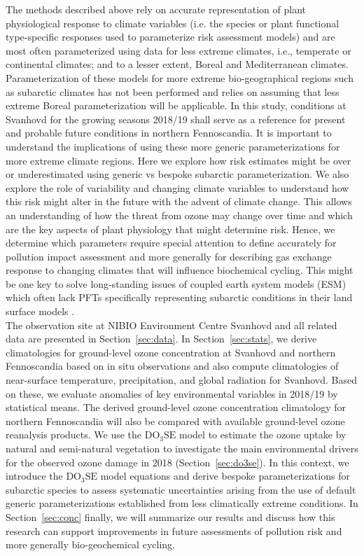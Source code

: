 \documentclass[bg, manuscript]{copernicus}
\begin{document}
The methods described above rely on accurate representation of plant physiological response to climate variables (i.e. the species or plant functional type-specific responses used to parameterize risk assessment models) and are most often parameterized using data for less extreme climates, i.e., temperate or continental climates; and to a lesser extent, Boreal and Mediterranean climates. Parameterization of these models for more extreme bio-geographical regions such as subarctic climates has not been performed and relies on assuming that less extreme Boreal parameterization will be applicable. In this study, conditions at Svanhovd for the growing seasons 2018/19 shall serve as a reference for present and probable future conditions in northern Fennoscandia.
It is important to understand the implications of using these more generic parameterizations for more extreme climate regions. Here we explore how risk estimates might be over or underestimated using generic vs bespoke subarctic parameterization. We also explore the role of \chem{[O_3]} variability and changing climate variables to understand how this risk might alter in the future with the advent of climate change. This allows an understanding of how the threat from ozone may change over time and which are the key aspects of plant physiology that might determine risk. Hence, we determine which parameters require special attention to define accurately for pollution impact assessment and more generally for describing gas exchange response to changing climates that will influence biochemical cycling. This might be one key to solve long-standing issues of coupled earth system models (ESM) which often lack PFTs specifically representing subarctic conditions in their land surface models \citep{GMD:Poulter2015,JAMES:Lawrence2019}.\\

The observation site at NIBIO Environment Centre Svanhovd and all related data are presented in Section~\ref{sec:data}. In Section~\ref{sec:stats}, we derive climatologies for ground-level ozone concentration at Svanhovd and northern Fennoscandia based on in situ observations and also compute climatologies of near-surface temperature, precipitation, and global radiation for Svanhovd. Based on these, we evaluate anomalies of key environmental variables in 2018/19 by statistical means. The derived ground-level ozone concentration climatology for northern Fennoscandia will also be compared with available ground-level ozone reanalysis products. We use the $\mathrm{DO_3SE}$ model to estimate the ozone uptake by natural and semi-natural vegetation to investigate the main environmental drivers for the observed ozone damage in 2018 (Section~\ref{sec:do3se}). In this context, we introduce the $\mathrm{DO_3SE}$ model equations and derive bespoke parameterizations for subarctic species to assess systematic uncertainties arising from the use of default generic parameterizations established from less climatically extreme conditions. In Section~\ref{sec:conc} finally, we will summarize our results and discuss how this research can support improvements in future assessments of pollution risk and more generally bio-geochemical cycling.
\end{document}
